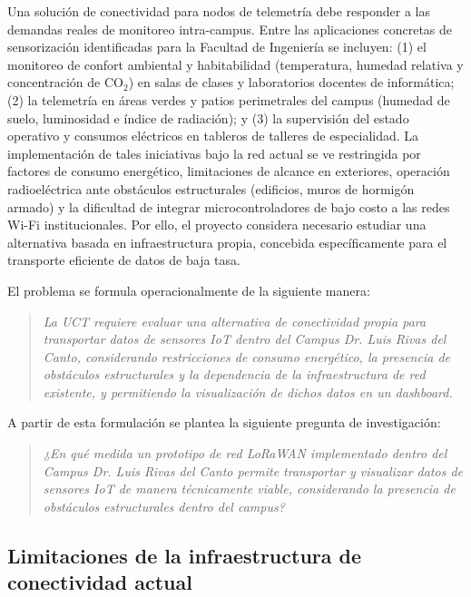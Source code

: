 \documentclass[12pt,oneside,openany,spanish,oldfontcommands]{memoir}
\begin{document}
Una solución de conectividad para nodos de telemetría debe responder a las demandas
reales de monitoreo intra-campus. Entre las aplicaciones concretas de sensorización
identificadas para la Facultad de Ingeniería se incluyen: (1) el monitoreo de confort
ambiental y habitabilidad (temperatura, humedad relativa y concentración de $\text{CO}_2$)
en salas de clases y laboratorios docentes de informática; (2) la telemetría en áreas verdes
y patios perimetrales del campus (humedad de suelo, luminosidad e índice de radiación); y
(3) la supervisión del estado operativo y consumos eléctricos en tableros de talleres de
especialidad. La implementación de tales iniciativas bajo la red actual se ve restringida
por factores de consumo energético, limitaciones de alcance en exteriores, operación
radioeléctrica ante obstáculos estructurales (edificios, muros de hormigón armado) y la
dificultad de integrar microcontroladores de bajo costo a las redes Wi-Fi institucionales.
Por ello, el proyecto considera necesario estudiar una alternativa basada en infraestructura
propia, concebida específicamente para el transporte eficiente de datos de baja tasa.

El problema se formula operacionalmente de la siguiente manera:

\begin{quote}
\textit{
La UCT requiere evaluar una alternativa de conectividad propia para transportar datos de
sensores IoT dentro del Campus Dr. Luis Rivas del Canto, considerando restricciones de
consumo energético, la presencia de obstáculos estructurales y la dependencia de la
infraestructura de red existente, y permitiendo la visualización de dichos datos en un
dashboard.
}
\end{quote}

A partir de esta formulación se plantea la siguiente pregunta de investigación:

\begin{quote}
\textit{
¿En qué medida un prototipo de red LoRaWAN implementado dentro del Campus Dr. Luis Rivas
del Canto permite transportar y visualizar datos de sensores IoT de manera técnicamente
viable, considerando la presencia de obstáculos estructurales dentro del campus?
}
\end{quote}

\subsection{Limitaciones de la infraestructura de conectividad actual}
\label{sec:limitaciones-infra}
\end{document}

